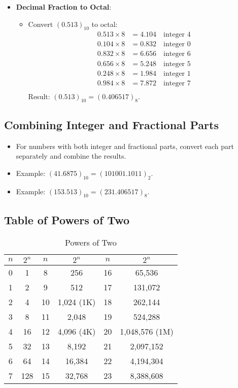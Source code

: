 \documentclass{article}
\begin{document}
\begin{itemize}
\begin{itemize}
		\end{itemize}
		\item \textbf{Decimal Fraction to Octal}:
		\begin{itemize}
			\item Convert $(0.513)_{10}$ to octal:
			\begin{align*}
				0.513 \times 8 &= 4.104 \quad \text{integer } 4 \\
				0.104 \times 8 &= 0.832 \quad \text{integer } 0 \\
				0.832 \times 8 &= 6.656 \quad \text{integer } 6 \\
				0.656 \times 8 &= 5.248 \quad \text{integer } 5 \\
				0.248 \times 8 &= 1.984 \quad \text{integer } 1 \\
				0.984 \times 8 &= 7.872 \quad \text{integer } 7 \\
			\end{align*}
			Result: $(0.513)_{10} = (0.406517)_8$.
		\end{itemize}
	\end{itemize}
	
	\subsection*{Combining Integer and Fractional Parts}
	\begin{itemize}
		\item For numbers with both integer and fractional parts, convert each part separately and combine the results.
		\item Example: $(41.6875)_{10} = (101001.1011)_2$.
		\item Example: $(153.513)_{10} = (231.406517)_8$.
	\end{itemize}
	
	\subsection*{Table of Powers of Two}
	\begin{table}[h!]
		\centering
		\begin{tabular}{cc|cc|cc}
			\toprule
			$n$ & $2^n$ & $n$ & $2^n$ & $n$ & $2^n$ \\
			\midrule
			0 & 1 & 8 & 256 & 16 & 65,536 \\
			1 & 2 & 9 & 512 & 17 & 131,072 \\
			2 & 4 & 10 & 1,024 (1K) & 18 & 262,144 \\
			3 & 8 & 11 & 2,048 & 19 & 524,288 \\
			4 & 16 & 12 & 4,096 (4K) & 20 & 1,048,576 (1M) \\
			5 & 32 & 13 & 8,192 & 21 & 2,097,152 \\
			6 & 64 & 14 & 16,384 & 22 & 4,194,304 \\
			7 & 128 & 15 & 32,768 & 23 & 8,388,608 \\
			\bottomrule
		\end{tabular}
		\caption{Powers of Two}
	\end{table}
	
\end{document}
